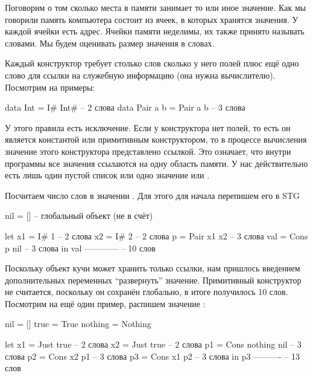 Поговорим о том сколько места в памяти занимает то или иное значение.
Как мы говорили память компьютера состоит из ячеек, в которых хранятся
значения. У каждой ячейки есть адрес. Ячейки памяти неделимы, их также
принято называть словами. Мы будем оценивать размер значения в словах.

Каждый конструктор требует столько слов сколько у него полей плюс ещё
одно слово для ссылки на служебную информацию (она нужна вычислителю).
Посмотрим на примеры:


\begin{code}
data Int = I# Int#              -- 2 слова
data Pair a b = Pair a b        -- 3 слова
\end{code}

У этого правила есть исключение. Если у конструктора нет полей, то есть
он является константой или примитивным конструктором, то в процессе
вычисления значение этого конструктора представлено ссылкой. Это
означает, что внутри программы все значения ссылаются на одну область
памяти. У нас действительно есть лишь один пустой список или одно
значение  или .

Посчитаем число слов в значении \In{[Pair 1 2]}. Для этого для начала
перепишем его в STG


\begin{code}
nil = []                 -- глобальный объект (не в счёт)

let x1  = I# 1           -- 2 слова
    x2  = I# 2           -- 2 слова
    p   = Pair x1 x2     -- 3 слова
    val = Cons p nil     -- 3 слова
in  val                  ------------
                         -- 10 слов   
\end{code}

Поскольку объект кучи  может хранить только ссылки, нам пришлось
введением дополнительных переменных ``развернуть'' значение. Примитивный
конструктор не считается, поскольку он сохранён глобально, в итоге
получилось 10 слов. Посмотрим на ещё один пример, распишем значение
:


\begin{code}
nil     = []
true    = True
nothing = Nothing

let x1 = Just true          -- 2 слова
    x2 = Just true          -- 2 слова
    p1 = Cons nothing nil   -- 3 слова
    p2 = Cons x2 p1         -- 3 слова
    p3 = Cons x1 p2         -- 3 слова 
in  p3                      ----------
                            -- 13 слов
\end{code}

